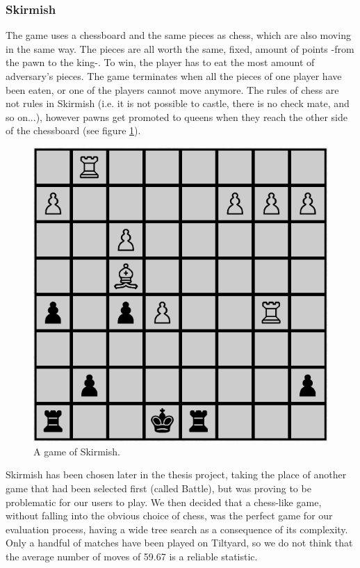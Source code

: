 \subsubsection*{Skirmish}
The game uses a chessboard and the same pieces as chess, which are also moving in the same way. The pieces are all worth the same, fixed, amount of points -from the pawn to the king-. To win, the player has to eat the most amount of adversary’s pieces. The game terminates when all the pieces of one player have been eaten, or one of the players cannot move anymore. The rules of chess are not rules in Skirmish (i.e. it is not possible to castle, there is no check mate, and so on...), however pawns get promoted to queens when they reach the other side of the chessboard (see figure \ref{fig:skirmish}).
\begin{figure}[H]
\centering
	\includegraphics[scale=0.35]{figure/skirmish}
    \caption{A game of Skirmish.}
    \label{fig:skirmish}
\end{figure}
Skirmish has been chosen later in the thesis project, taking the place of another game that had been selected first (called Battle), but was proving to be problematic for our users to play. We then decided that a chess-like game, without falling into the obvious choice of chess, was the perfect game for our evaluation process, having a wide tree search as a consequence of its complexity. Only a handful of matches have been played on Tiltyard, so we do not think that the average number of moves of 59.67\cite{skirmish} is a reliable statistic. 
